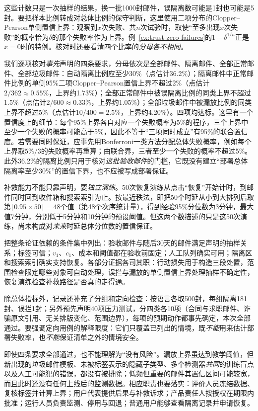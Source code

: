 这些计数只是一次抽样的结果，换一批1000封邮件，误隔离数可能是1封也可能是5封。要把样本比例转成对总体比例的保守判断，这里使用二项分布的Clopper--Pearson单侧置信上界：观察到$x$次失败、共$n$次试验时，取使“至多出现$x$次失败”的概率恰为$\delta$的那个失败率作为上界。例~\ref{ex:trust-zero-failures}的$1-\delta^{1/n}$正是$x=0$时的特例。核对时还要看清四个比率的\emph{分母各不相同}。

我们逐项核对\emph{事先}声明的四条要求，分母依次是全部邮件、隔离邮件、全部正常邮件、全部垃圾邮件：自动隔离比例应至少30\%（点估计36.2\%）；隔离邮件中正常邮件比例的单侧95\%二项Clopper--Pearson置信上界不超过2\%（点估计$2/362\approx0.55\%$，上界约1.73\%）；全部正常邮件中被误隔离比例的同类上界不超过1.5\%（点估计$2/600\approx0.33\%$，上界约1.05\%）；全部垃圾邮件中被漏放比例的同类上界不超过5\%（点估计$10/400=2.5\%$，上界约4.20\%）。四项均达标。这里有一个置信度上的细节：每个95\%上界各自对应一个失败概率为5\%的程序，三个上界中至少一个失败的概率可能高于5\%，因此不等于“三项同时成立”有95\%的联合置信度。若需要同时保证，应事先用Bonferroni一类方法分配总体失败概率，例如每个上界取$5\%/3$的失败概率再重算；由联合界，三者至少一个失败的概率不超过5\%。此外36.2\%的隔离比例只用于核对\emph{这批验收邮件}的门槛，它既没有建立“部署总体隔离率至少30\%”的置信下界，也不应被写成部署保证。

补救能力不能只靠声明，要\emph{独立演练}。50次恢复演练从点击“恢复”开始计时，到邮件同时回到收件箱和搜索索引为止。按最近秩法，即把50个时延从小到大排列后取第$\lceil0.95\times50\rceil=48$个值（第48个次序统计量），得到经验95\%分位数为3分钟，最大值7分钟，分别低于5分钟和10分钟的预设阈值。但这两个数描述的只是这50次演练，尚未构成对\emph{未来}时延总体分位数的置信保证。

把整条论证依赖的条件集中列出：验收邮件与随后30天的邮件满足声明的抽样关系；标签可信；$v_1$、$c_1$、成本和阈值都在验收前固定；人工队列确实可用；隔离区和搜索索引确实支持恢复。各部分证据各司其职：行动损失用于构造三段处置，范围检查限定哪些对象可自动处理，误拦与漏放的单侧置信上界处理抽样不确定性，恢复演练检查补救路径是否真的走得通。

除总体指标外，记录还补充了分组和定向检查：按语言各取500封，每组隔离181封、误拦1封；另外预先声明40项压力测试，分四类各10项（合同与求职邮件、诈骗原文引用、无关排版变化、范围边界），每项的预期动作都事先确定，本次全部通过。要强调定向用例的解释限度：它们只覆盖已列出的情境，既\emph{不能}用来估计部署失败率，也\emph{不能}保证清单之外的情境安全。

即使四条要求全部通过，也不能理解为“没有风险”。漏放上界虽达到教学阈值，但新出现的垃圾邮件模板、未被标签表示的隐藏子类型、多个检测器\emph{共同}的训练盲点以及人工可能犯的错误，都没有被排除；低频但重要的邮件其置信区间可能较宽，而且此时还没有任何上线后的监测数据。相应职责也要落实：评价人员冻结数据、复核标签并计算上界；用户代表提供后果与补救诉求；产品责任人按授权在期限内批准；运行人员负责监测、停用与回退；普通用户能够查看隔离记录并申请恢复。

